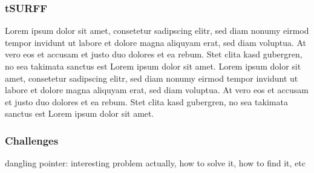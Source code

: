 \subsubsection{tSURFF}
Lorem ipsum dolor sit amet, consetetur sadipscing elitr, sed diam nonumy eirmod tempor invidunt ut labore et dolore magna aliquyam erat, sed diam voluptua. At vero eos et accusam et justo duo dolores et ea rebum. Stet clita kasd gubergren, no sea takimata sanctus est Lorem ipsum dolor sit amet. Lorem ipsum dolor sit amet, consetetur sadipscing elitr, sed diam nonumy eirmod tempor invidunt ut labore et dolore magna aliquyam erat, sed diam voluptua. At vero eos et accusam et justo duo dolores et ea rebum. Stet clita kasd gubergren, no sea takimata sanctus est Lorem ipsum dolor sit amet.
\subsubsection{Challenges}
dangling pointer: interesting problem actually, how to solve it, how to find it, etc





